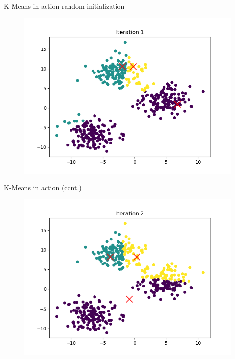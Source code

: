 \documentclass[serif, aspectratio=169]{beamer}
\begin{document}
\begin{frame}{K-Means in action}
random initialization
    \begin{figure}
        \centering
        \includegraphics[scale=0.45]{kmeans_in_action_figures/kmeans_iter_1.png}
    \end{figure}
\end{frame}
\begin{frame}{K-Means in action (cont.)}
    \begin{figure}
        \centering
        \includegraphics[scale=0.45]{kmeans_in_action_figures/kmeans_iter_2.png}
    \end{figure}
\end{frame}
\end{document}
